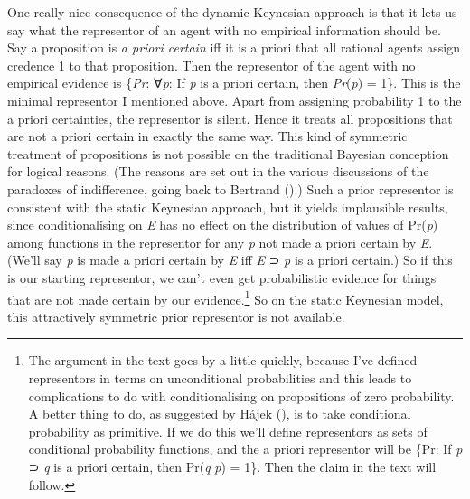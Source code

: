 \documentclass[
  10pt,
  letterpaper,
  DIV=11,
  numbers=noendperiod,
  twoside]{scrartcl}
\begin{document}
One really nice consequence of the dynamic Keynesian approach is that it
lets us say what the representor of an agent with no empirical
information should be. Say a proposition is \emph{a priori certain} iff
it is a priori that all rational agents assign credence 1 to that
proposition. Then the representor of the agent with no empirical
evidence is \{\emph{Pr}: ∀\emph{p}: If \emph{p} is a priori certain,
then \emph{Pr}(\emph{p}) = 1\}. This is the minimal representor I
mentioned above. Apart from assigning probability 1 to the a priori
certainties, the representor is silent. Hence it treats all propositions
that are not a priori certain in exactly the same way. This kind of
symmetric treatment of propositions is not possible on the traditional
Bayesian conception for logical reasons. (The reasons are set out in the
various discussions of the paradoxes of indifference, going back to
Bertrand ().) Such a prior representor
is consistent with the static Keynesian approach, but it yields
implausible results, since conditionalising on \emph{E} has no effect on
the distribution of values of Pr(\emph{p}) among functions in the
representor for any \emph{p} not made a priori certain by \emph{E}.
(We'll say \emph{p} is made a priori certain by \emph{E} iff \emph{E} ⊃
\emph{p} is a priori certain.) So if this is our starting representor,
we can't even get probabilistic evidence for things that are not made
certain by our evidence.\footnote{The argument in the text goes by a
  little quickly, because I've defined representors in terms on
  unconditional probabilities and this leads to complications to do with
  conditionalising on propositions of zero probability. A better thing
  to do, as suggested by Hájek (), is to
  take conditional probability as primitive. If we do this we'll define
  representors as sets of conditional probability functions, and the a
  priori representor will be \{Pr: If \emph{p} ⊃ \emph{q} is a priori
  certain, then Pr(\emph{q} \emph{p}) = 1\}. Then the claim in the text
  will follow.} So on the static Keynesian model, this attractively
symmetric prior representor is not available.
\end{document}
